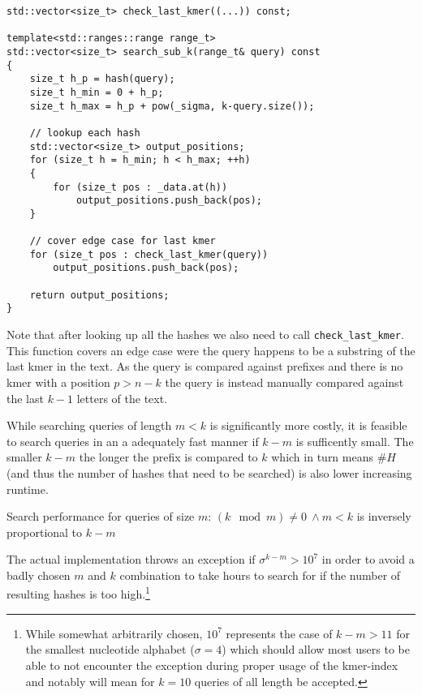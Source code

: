 \begin{minipage}{\linewidth} %
\begin{lstlisting}[caption={Search function for queries of size 0 < m < k.},language={[GNU]C++},tabsize=2]
std::vector<size_t> check_last_kmer((...)) const;

template<std::ranges::range range_t>
std::vector<size_t> search_sub_k(range_t& query) const
{
	size_t h_p = hash(query);
	size_t h_min = 0 + h_p;
	size_t h_max = h_p + pow(_sigma, k-query.size());

	// lookup each hash
	std::vector<size_t> output_positions;
	for (size_t h = h_min; h < h_max; ++h)
	{
		for (size_t pos : _data.at(h))
			output_positions.push_back(pos);
	}

	// cover edge case for last kmer
	for (size_t pos : check_last_kmer(query))
		output_positions.push_back(pos);

	return output_positions;
}
\end{lstlisting}
\end{minipage}
\label{section m < k}

Note that after looking up all the hashes we also need to call \lstinline{check_last_kmer}. This function covers an
edge case were the query happens to be a substring of the last kmer in the text. As the query is compared
against prefixes and there is no kmer with a position $p>n-k$ the query is instead
manually compared against the last $k-1$ letters of the text.

While searching queries of length $m<k$ is significantly more costly, it is feasible to search queries in an a
adequately fast manner if $k-m$ is sufficently small. The smaller $k-m$ the longer the prefix is compared to $k$ which
in turn means $\#H$ (and thus the number of hashes that need to be searched) is also lower increasing runtime.

\begin{lem}
\label{Lemma 2}
Search performance for queries of size $m:\,(k\mod m)\neq0\:\land m<k$ is inversely proportional to $k-m$
\end{lem}

The actual implementation throws an exception if $\sigma^{k-m}>10^{7}$ in order to avoid a badly chosen $m$ and $k$
combination to take hours to search for if the number of resulting hashes is too high.\footnote{While somewhat arbitrarily
chosen, $10^{7}$ represents the case of $k-m>11$ for the smallest nucleotide alphabet ($\sigma=4$) which should allow most users
to be able to not encounter the exception during proper usage of the kmer-index and notably will mean for $k=10$ queries
of all length be accepted.}

